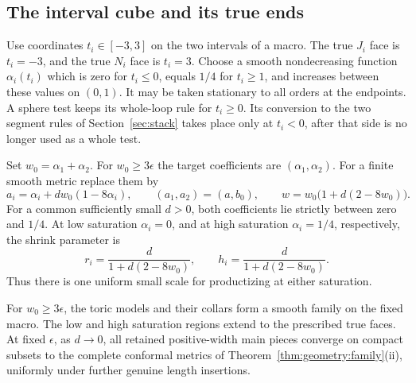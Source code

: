 \subsection{The interval cube and its true ends}

Use coordinates $t_i\in[-3,3]$ on the two intervals of a macro.
The true $J_i$ face is $t_i=-3$, and the true $N_i$ face is
$t_i=3$.  Choose a smooth nondecreasing function $\alpha_i(t_i)$
which is zero for $t_i\le0$, equals $1/4$ for $t_i\ge1$, and
increases between these values on $(0,1)$.  It may be taken
stationary to all orders at the endpoints.  A sphere test keeps
its whole-loop rule for $t_i\ge0$.  Its conversion to the two
segment rules of Section~\ref{sec:stack} takes place only at
$t_i<0$, after that side is no longer used as a whole test.

Set $w_0=\alpha_1+\alpha_2$.  For $w_0\ge3\epsilon$ the
target coefficients are $(\alpha_1,\alpha_2)$.  For a finite
smooth metric replace them by
\begin{equation}
 a_i=\alpha_i+d w_0(1-8\alpha_i),\qquad
 (a_1,a_2)=(a,b_0),\qquad
 w=w_0\bigl(1+d(2-8w_0)\bigr).
 \label{eq:geometry:regularization}
\end{equation}
For a common sufficiently small $d>0$, both coefficients lie
strictly between zero and $1/4$.  At low saturation
$\alpha_i=0$, and at high saturation $\alpha_i=1/4$, respectively,
the shrink parameter is
\begin{equation}
 r_i=\frac{d}{1+d(2-8w_0)},\qquad
 h_i=\frac{d}{1+d(2-8w_0)}.
 \label{eq:geometry:saturation-scale}
\end{equation}
Thus there is one uniform small scale for productizing at either
saturation.

\begin{proposition}
\label{prop:geometry:assembly}
For $w_0\ge3\epsilon$, the toric models and their collars form
a smooth family on the fixed macro.  The low and high saturation
regions extend to the prescribed true faces.  At fixed $\epsilon$,
as $d\to0$, all retained positive-width main pieces converge
on compact subsets to the complete conformal metrics of
Theorem~\ref{thm:geometry:family}\textup{(ii)}, uniformly under
further genuine length insertions.
\end{proposition}

